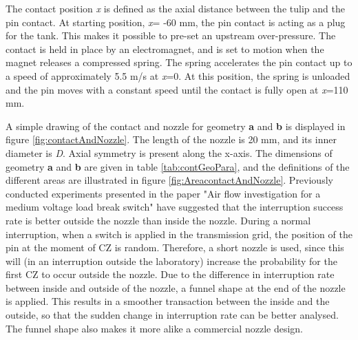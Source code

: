 \documentclass[10pt,b5paper,twoside]{article}
\begin{document}
The contact position \textit{x} is defined as the axial distance between the tulip and the pin contact. At starting position, \textit{x}= -60 mm, the pin contact is acting as a plug for the tank. This makes it possible to pre-set an upstream over-pressure. The contact is held in place by an electromagnet, and is set to motion when the magnet releases a compressed spring. The spring accelerates the pin contact up to a speed of approximately 5.5 m/s at \textit{x}=0. At this position, the spring is unloaded and the pin moves with a constant speed until the contact is fully open at \textit{x}=110 mm.

A simple drawing of the contact and nozzle for geometry \textbf{a} and \textbf{b} is displayed in figure \ref{fig:contactAndNozzle}. The length of the nozzle is 20 mm, and its inner diameter is \textit{D}. Axial symmetry is present along the x-axis. The dimensions of geometry \textbf{a} and \textbf{b} are given in table \ref{tab:contGeoPara}, and the definitions of the different areas are illustrated in figure \ref{fig:AreacontactAndNozzle}. Previously conducted experiments presented in the paper "Air flow investigation for a medium voltage load break switch" \cite{bib:AFIMVLBA} have suggested that the interruption success rate is better outside the nozzle than inside the nozzle. During a normal interruption, when a switch is applied in the transmission grid, the position of the pin at the moment of CZ is random. Therefore, a short nozzle is used, since this will (in an interruption outside the laboratory) increase the probability for the first CZ to occur outside the nozzle. Due to the difference in interruption rate between inside and outside of the nozzle, a funnel shape at the end of the nozzle is applied. This results in a smoother transaction between the inside and the outside, so that the sudden change in interruption rate can be better analysed. The funnel shape also makes it more alike a commercial nozzle design.
\end{document}
